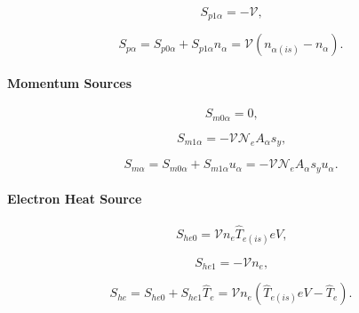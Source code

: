 \documentclass[11pt]{article}
\begin{document}
\begin{equation}
S_{p1\alpha}=-\mathcal{V}\text{,}   \label{c349}
\end{equation}

\begin{equation}
S_{p\alpha}=S_{p0\alpha}+S_{p1\alpha}n_{\alpha}=\mathcal{V}\left(
n_{\alpha\left( is\right) }-n_{\alpha}\right) \text{.}   \label{c350}
\end{equation}

\bigskip

\paragraph{Momentum Sources}

\bigskip

\begin{equation}
S_{m0\alpha}=0\text{,}   \label{c351}
\end{equation}

\begin{equation}
S_{m1\alpha}=-\mathcal{VN}_{e}A_{\alpha}s_{y}\text{,}   \label{c352}
\end{equation}

\begin{equation}
S_{m\alpha}=S_{m0\alpha}+S_{m1\alpha}u_{\alpha}=-\mathcal{VN}_{e}A_{\alpha
}s_{y}u_{\alpha}\text{.}   \label{c353}
\end{equation}

\bigskip

\paragraph{Electron Heat Source}

\bigskip

\begin{equation}
S_{he0}=\mathcal{V}n_{e}\widehat{T}_{e\left( is\right) }eV\text{,} 
\label{c354}
\end{equation}

\begin{equation}
S_{he1}=-\mathcal{V}n_{e}\text{,}   \label{c355}
\end{equation}

\begin{equation}
S_{he}=S_{he0}+S_{he1}\widehat{T}_{e}=\mathcal{V}n_{e}\left( \widehat
{T}_{e\left( is\right) }eV-\widehat{T}_{e}\right) \text{.}   \label{c356}
\end{equation}

\bigskip
\end{document}
